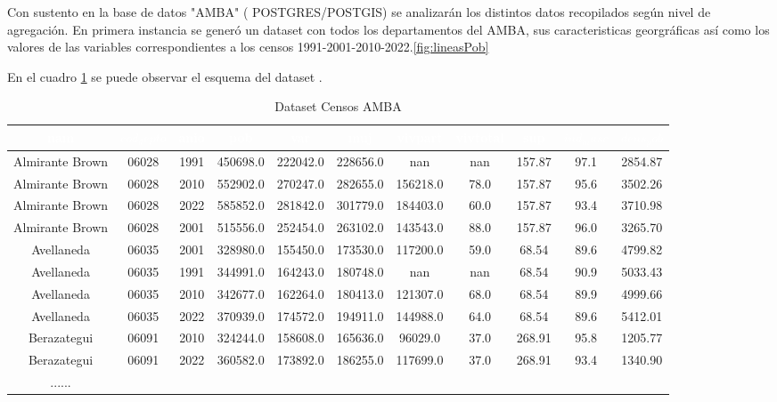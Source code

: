 \documentclass{article}
\theoremstyle{mytheoremstyle}
\theoremstyle{mytheoremstyle}
\theoremstyle{myproblemstyle}
\begin{document}
Con sustento en la base de datos "AMBA" ( POSTGRES/POSTGIS) se analizarán los distintos datos recopilados según nivel de agregación.
En primera instancia se  generó un dataset con todos los departamentos del AMBA, sus caracteristicas georgráficas así como los valores
de las variables correspondientes a los censos 1991-2001-2010-2022.\ref{fig:lineasPob}
 
En el cuadro \ref{tab:censos_amba} se puede observar el esquema del dataset .
\begin{table}[htb]
  \centering
  \footnotesize
  \begin{tabular}{|c|c|c|c|c|c|c|c|c|c|c|}
  \hline
    \textbf{\cellcolor[rgb]{0,0.231,0.427}\textcolor{white}{nam}} &
   \textbf{\cellcolor[rgb]{0,0.231,0.427}\textcolor{white}{$cod_depto$}} 
   & \textbf{\cellcolor[rgb]{0,0.231,0.427}\textcolor{white}{anio}} &
   \textbf{\cellcolor[rgb]{0,0.231,0.427}\textcolor{white}{pob}} & 
   \textbf{\cellcolor[rgb]{0,0.231,0.427}\textcolor{white}{var}} & 
   \textbf{\cellcolor[rgb]{0,0.231,0.427}\textcolor{white}{muj}} &
    \textbf{\cellcolor[rgb]{0,0.231,0.427}\textcolor{white}{vivpart}} & 
    \textbf{\cellcolor[rgb]{0,0.231,0.427}\textcolor{white}{vivtotal}} &
     \textbf{\cellcolor[rgb]{0,0.231,0.427}\textcolor{white}{sup}} &
      \textbf{\cellcolor[rgb]{0,0.231,0.427}\textcolor{white}{$ind_masc$}} &
       \textbf{\cellcolor[rgb]{0,0.231,0.427}\textcolor{white}{$dens_pob$}} \\
  \hline
  Almirante Brown & 06028 & 1991 & 450698.0 & 222042.0 & 228656.0 & nan & nan & 157.87 & 97.1 & 2854.87 \\
  Almirante Brown & 06028 & 2010 & 552902.0 & 270247.0 & 282655.0 & 156218.0 & 78.0 & 157.87 & 95.6 & 3502.26 \\
  Almirante Brown & 06028 & 2022 & 585852.0 & 281842.0 & 301779.0 & 184403.0 & 60.0 & 157.87 & 93.4 & 3710.98 \\
  Almirante Brown & 06028 & 2001 & 515556.0 & 252454.0 & 263102.0 & 143543.0 & 88.0 & 157.87 & 96.0 & 3265.70 \\
  Avellaneda & 06035 & 2001 & 328980.0 & 155450.0 & 173530.0 & 117200.0 & 59.0 & 68.54 & 89.6 & 4799.82 \\
  Avellaneda & 06035 & 1991 & 344991.0 & 164243.0 & 180748.0 & nan & nan & 68.54 & 90.9 & 5033.43 \\
  Avellaneda & 06035 & 2010 & 342677.0 & 162264.0 & 180413.0 & 121307.0 & 68.0 & 68.54 & 89.9 & 4999.66 \\
  Avellaneda & 06035 & 2022 & 370939.0 & 174572.0 & 194911.0 & 144988.0 & 64.0 & 68.54 & 89.6 & 5412.01 \\
  Berazategui & 06091 & 2010 & 324244.0 & 158608.0 & 165636.0 & 96029.0 & 37.0 & 268.91 & 95.8 & 1205.77 \\
  Berazategui & 06091 & 2022 & 360582.0 & 173892.0 & 186255.0 & 117699.0 & 37.0 & 268.91 & 93.4 & 1340.90 \\
  ...... &  &  &  &  &  & &  &  &  &  \\ \hline
  \end{tabular}
  \caption{Dataset Censos AMBA}
  \label{tab:censos_amba}
  \end{table}
  
\end{document}
